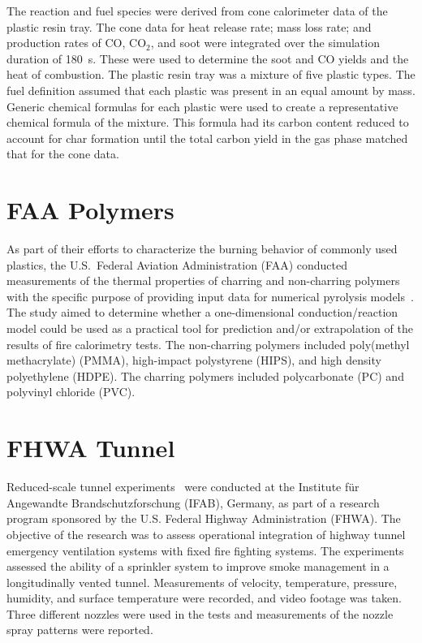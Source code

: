 The reaction and fuel species were derived from cone calorimeter data of the plastic resin tray. The cone data for heat release rate; mass loss rate; and production rates of CO, CO$_2$, and soot were integrated over the simulation duration of 180~s. These were used to determine the soot and CO yields and the heat of combustion. The plastic resin tray was a mixture of five plastic types. The fuel definition assumed that each plastic was present in an equal amount by mass. Generic chemical formulas for each plastic were used to create a representative chemical formula of the mixture. This formula had its carbon content reduced to account for char formation until the total carbon yield in the gas phase matched that for the cone data.

\section{FAA Polymers}
\label{FAA_Polymers_Description}

As part of their efforts to characterize the burning behavior of commonly used plastics, the U.S.~Federal Aviation Administration (FAA) conducted measurements of the thermal properties of charring and non-charring polymers with the specific purpose of providing input data for numerical pyrolysis models~\cite{Stoliarov:CF2009,Stoliarov:CF2010}. The study aimed to determine whether a one-dimensional conduction/reaction model could be used as a practical tool for prediction and/or extrapolation of the results of fire calorimetry tests. The non-charring polymers included poly(methyl methacrylate) (PMMA), high-impact polystyrene (HIPS), and high density polyethylene (HDPE). The charring polymers included polycarbonate (PC) and polyvinyl chloride (PVC).


\section{FHWA Tunnel}
\label{FHWA_Tunnel_Description}

Reduced-scale tunnel experiments~\cite{FHWA:test_report} were conducted at the Institute f{\"u}r Angewandte Brandschutzforschung (IFAB), Germany, as part of a research program sponsored by the U.S. Federal Highway Administration (FHWA). The objective of the research was to assess operational integration of highway tunnel emergency ventilation systems with fixed fire fighting systems. The experiments assessed the ability of a sprinkler system to improve smoke management in a longitudinally vented tunnel. Measurements of velocity, temperature, pressure, humidity, and surface temperature were recorded, and video footage was taken. Three different nozzles were used in the tests and measurements of the nozzle spray patterns were reported.

